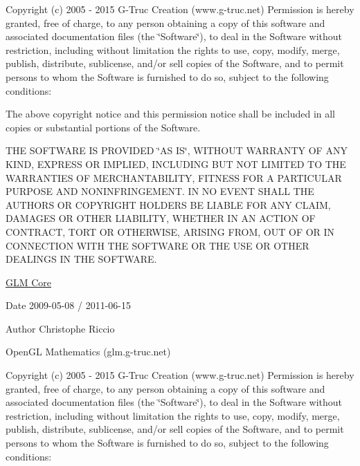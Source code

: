 Copyright (c) 2005 -\/ 2015 G-\/\-Truc Creation (www.\-g-\/truc.\-net) Permission is hereby granted, free of charge, to any person obtaining a copy of this software and associated documentation files (the \char`\"{}\-Software\char`\"{}), to deal in the Software without restriction, including without limitation the rights to use, copy, modify, merge, publish, distribute, sublicense, and/or sell copies of the Software, and to permit persons to whom the Software is furnished to do so, subject to the following conditions\-:

The above copyright notice and this permission notice shall be included in all copies or substantial portions of the Software.

T\-H\-E S\-O\-F\-T\-W\-A\-R\-E I\-S P\-R\-O\-V\-I\-D\-E\-D \char`\"{}\-A\-S I\-S\char`\"{}, W\-I\-T\-H\-O\-U\-T W\-A\-R\-R\-A\-N\-T\-Y O\-F A\-N\-Y K\-I\-N\-D, E\-X\-P\-R\-E\-S\-S O\-R I\-M\-P\-L\-I\-E\-D, I\-N\-C\-L\-U\-D\-I\-N\-G B\-U\-T N\-O\-T L\-I\-M\-I\-T\-E\-D T\-O T\-H\-E W\-A\-R\-R\-A\-N\-T\-I\-E\-S O\-F M\-E\-R\-C\-H\-A\-N\-T\-A\-B\-I\-L\-I\-T\-Y, F\-I\-T\-N\-E\-S\-S F\-O\-R A P\-A\-R\-T\-I\-C\-U\-L\-A\-R P\-U\-R\-P\-O\-S\-E A\-N\-D N\-O\-N\-I\-N\-F\-R\-I\-N\-G\-E\-M\-E\-N\-T. I\-N N\-O E\-V\-E\-N\-T S\-H\-A\-L\-L T\-H\-E A\-U\-T\-H\-O\-R\-S O\-R C\-O\-P\-Y\-R\-I\-G\-H\-T H\-O\-L\-D\-E\-R\-S B\-E L\-I\-A\-B\-L\-E F\-O\-R A\-N\-Y C\-L\-A\-I\-M, D\-A\-M\-A\-G\-E\-S O\-R O\-T\-H\-E\-R L\-I\-A\-B\-I\-L\-I\-T\-Y, W\-H\-E\-T\-H\-E\-R I\-N A\-N A\-C\-T\-I\-O\-N O\-F C\-O\-N\-T\-R\-A\-C\-T, T\-O\-R\-T O\-R O\-T\-H\-E\-R\-W\-I\-S\-E, A\-R\-I\-S\-I\-N\-G F\-R\-O\-M, O\-U\-T O\-F O\-R I\-N C\-O\-N\-N\-E\-C\-T\-I\-O\-N W\-I\-T\-H T\-H\-E S\-O\-F\-T\-W\-A\-R\-E O\-R T\-H\-E U\-S\-E O\-R O\-T\-H\-E\-R D\-E\-A\-L\-I\-N\-G\-S I\-N T\-H\-E S\-O\-F\-T\-W\-A\-R\-E.

\hyperlink{group__core}{G\-L\-M Core}

\begin{DoxyDate}{Date}
2009-\/05-\/08 / 2011-\/06-\/15 
\end{DoxyDate}
\begin{DoxyAuthor}{Author}
Christophe Riccio
\end{DoxyAuthor}
Open\-G\-L Mathematics (glm.\-g-\/truc.\-net)

Copyright (c) 2005 -\/ 2015 G-\/\-Truc Creation (www.\-g-\/truc.\-net) Permission is hereby granted, free of charge, to any person obtaining a copy of this software and associated documentation files (the \char`\"{}\-Software\char`\"{}), to deal in the Software without restriction, including without limitation the rights to use, copy, modify, merge, publish, distribute, sublicense, and/or sell copies of the Software, and to permit persons to whom the Software is furnished to do so, subject to the following conditions\-:

